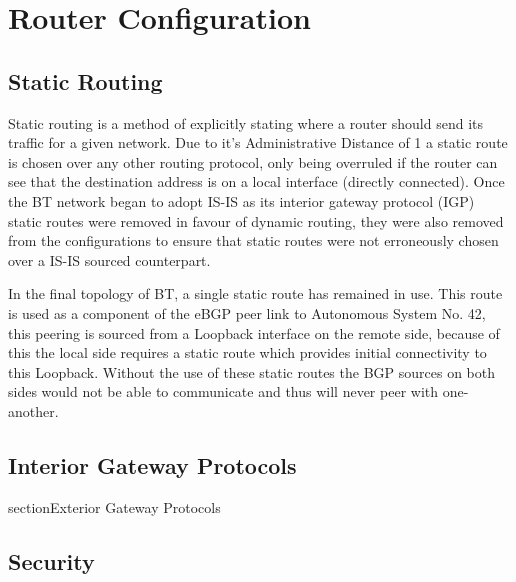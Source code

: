 \chapter{Router Configuration} \section{Static Routing} Static routing is a
method of explicitly stating where a router should send its traffic for a given
network. Due to it's Administrative Distance of 1 a static route is chosen over
any other routing protocol, only being overruled if the router can see that the
destination address is on a local interface (directly connected). Once the BT
network began to adopt IS-IS as its interior gateway protocol (IGP) static
routes were removed in favour of dynamic routing, they were also removed from
the configurations to ensure that static routes were not erroneously chosen over
a IS-IS sourced counterpart.

In the final topology of BT, a single static route has remained in use. This
route is used as a component of the eBGP peer link to Autonomous System No. 42,
this peering is sourced from a Loopback interface on the remote side, because of
this the local side requires a static route which provides initial connectivity
to this Loopback. Without the use of these static routes the BGP sources on both
sides would not be able to communicate and thus will never peer with one-
another.

\section{Interior Gateway Protocols} section{Exterior Gateway Protocols}
\section{Security}
